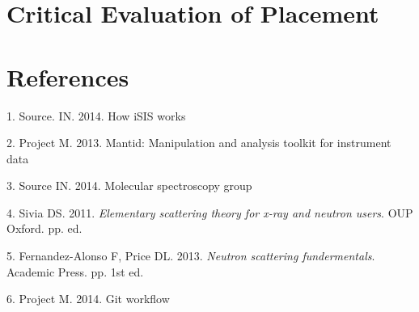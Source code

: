 \documentclass[paper=a4, fontsize=11pt]{scrartcl}	%
\numberwithin{equation}{section}															%
\numberwithin{figure}{section}																%
\numberwithin{table}{section}
\begin{document}
\section{Critical Evaluation of
Placement}\label{critical-evaluation-of-placement}

\section*{References}\label{references}

1. Source. IN. 2014. How iSIS works

2. Project M. 2013. Mantid: Manipulation and analysis toolkit for
instrument data

3. Source IN. 2014. Molecular spectroscopy group

4. Sivia DS. 2011. \emph{Elementary scattering theory for x-ray and
neutron users}. OUP Oxford. pp. ed.

5. Fernandez-Alonso F, Price DL. 2013. \emph{Neutron scattering
fundermentals}. Academic Press. pp. 1st ed.

6. Project M. 2014. Git workflow
\end{document}
